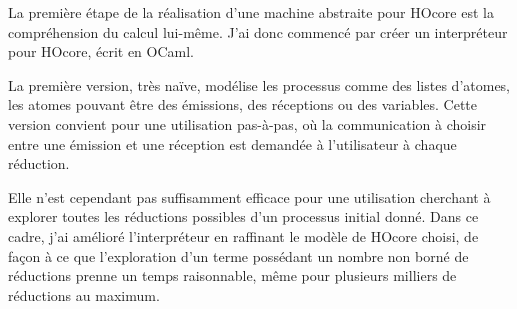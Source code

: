 \documentclass[11pt]{article}
\begin{document}
La première étape de la réalisation d'une machine abstraite pour HOcore est la compréhension du calcul lui-même.
J'ai donc commencé par créer un interpréteur pour HOcore, écrit en OCaml.

La première version, très naïve, modélise les processus comme des listes d'atomes, les atomes pouvant être des émissions, des réceptions ou des variables.
Cette version convient pour une utilisation pas-à-pas, où la communication à choisir entre une émission et une réception est demandée à l'utilisateur à chaque réduction.

Elle n'est cependant pas suffisamment efficace pour une utilisation cherchant à explorer toutes les réductions possibles d'un processus initial donné.
Dans ce cadre, j'ai amélioré l'interpréteur en raffinant le modèle de HOcore choisi, de façon à ce que l'exploration d'un terme possédant un nombre non borné de réductions prenne un temps raisonnable, même pour plusieurs milliers de réductions au maximum.
\end{document}
